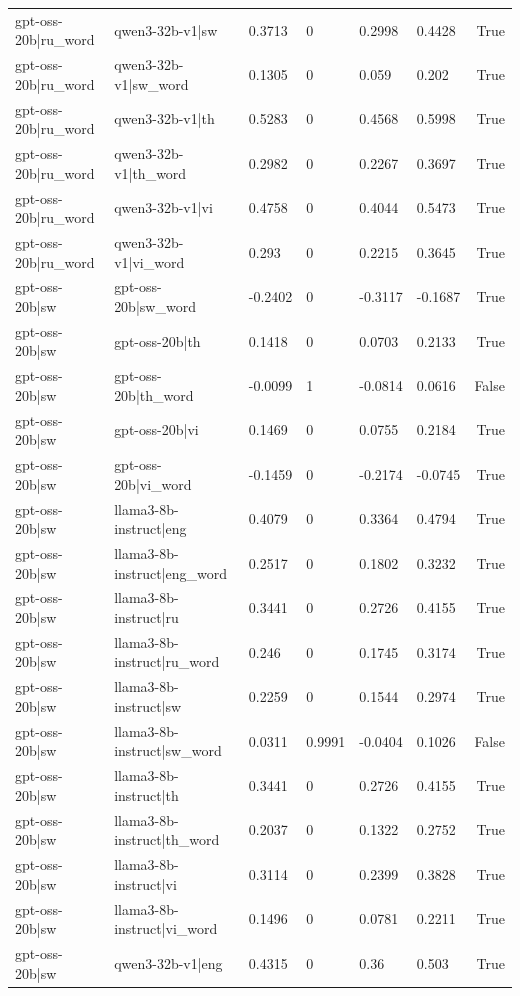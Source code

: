 \begin{table}
\begin{tabular}{llllllr}
gpt-oss-20b|ru_word & qwen3-32b-v1|sw & 0.3713 & 0 & 0.2998 & 0.4428 & True \\
gpt-oss-20b|ru_word & qwen3-32b-v1|sw_word & 0.1305 & 0 & 0.059 & 0.202 & True \\
gpt-oss-20b|ru_word & qwen3-32b-v1|th & 0.5283 & 0 & 0.4568 & 0.5998 & True \\
gpt-oss-20b|ru_word & qwen3-32b-v1|th_word & 0.2982 & 0 & 0.2267 & 0.3697 & True \\
gpt-oss-20b|ru_word & qwen3-32b-v1|vi & 0.4758 & 0 & 0.4044 & 0.5473 & True \\
gpt-oss-20b|ru_word & qwen3-32b-v1|vi_word & 0.293 & 0 & 0.2215 & 0.3645 & True \\
gpt-oss-20b|sw & gpt-oss-20b|sw_word & -0.2402 & 0 & -0.3117 & -0.1687 & True \\
gpt-oss-20b|sw & gpt-oss-20b|th & 0.1418 & 0 & 0.0703 & 0.2133 & True \\
gpt-oss-20b|sw & gpt-oss-20b|th_word & -0.0099 & 1 & -0.0814 & 0.0616 & False \\
gpt-oss-20b|sw & gpt-oss-20b|vi & 0.1469 & 0 & 0.0755 & 0.2184 & True \\
gpt-oss-20b|sw & gpt-oss-20b|vi_word & -0.1459 & 0 & -0.2174 & -0.0745 & True \\
gpt-oss-20b|sw & llama3-8b-instruct|eng & 0.4079 & 0 & 0.3364 & 0.4794 & True \\
gpt-oss-20b|sw & llama3-8b-instruct|eng_word & 0.2517 & 0 & 0.1802 & 0.3232 & True \\
gpt-oss-20b|sw & llama3-8b-instruct|ru & 0.3441 & 0 & 0.2726 & 0.4155 & True \\
gpt-oss-20b|sw & llama3-8b-instruct|ru_word & 0.246 & 0 & 0.1745 & 0.3174 & True \\
gpt-oss-20b|sw & llama3-8b-instruct|sw & 0.2259 & 0 & 0.1544 & 0.2974 & True \\
gpt-oss-20b|sw & llama3-8b-instruct|sw_word & 0.0311 & 0.9991 & -0.0404 & 0.1026 & False \\
gpt-oss-20b|sw & llama3-8b-instruct|th & 0.3441 & 0 & 0.2726 & 0.4155 & True \\
gpt-oss-20b|sw & llama3-8b-instruct|th_word & 0.2037 & 0 & 0.1322 & 0.2752 & True \\
gpt-oss-20b|sw & llama3-8b-instruct|vi & 0.3114 & 0 & 0.2399 & 0.3828 & True \\
gpt-oss-20b|sw & llama3-8b-instruct|vi_word & 0.1496 & 0 & 0.0781 & 0.2211 & True \\
gpt-oss-20b|sw & qwen3-32b-v1|eng & 0.4315 & 0 & 0.36 & 0.503 & True \\

\end{tabular}
\end{table}
